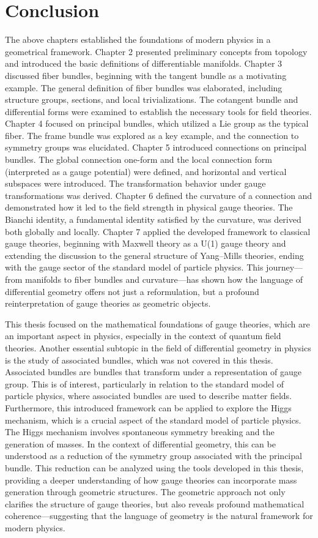 
\chapter{Conclusion}

The above chapters established the foundations of modern physics in a geometrical framework. Chapter 2 presented preliminary concepts from topology and introduced the basic definitions of differentiable manifolds. Chapter 3 discussed fiber bundles, beginning with the tangent bundle as a motivating example. The general definition of fiber bundles was elaborated, including structure groups, sections, and local trivializations. The cotangent bundle and differential forms were examined to establish the necessary tools for field theories. Chapter 4 focused on principal bundles, which utilized a Lie group as the typical fiber. The frame bundle was explored as a key example, and the connection to symmetry groups was elucidated. Chapter 5 introduced connections on principal bundles. The global connection one-form and the local connection form (interpreted as a gauge potential) were defined, and horizontal and vertical subspaces were introduced. The transformation behavior under gauge transformations was derived. Chapter 6 defined the curvature of a connection and demonstrated how it led to the field strength in physical gauge theories. The Bianchi identity, a fundamental identity satisfied by the curvature, was derived both globally and locally. Chapter 7 applied the developed framework to classical gauge theories, beginning with Maxwell theory as a U(1) gauge theory and extending the discussion to the general structure of Yang–Mills theories, ending with the gauge sector of the standard model of particle physics. This journey—from manifolds to fiber bundles and curvature—has shown how the language of differential geometry offers not just a reformulation, but a profound reinterpretation of gauge theories as geometric objects.

This thesis focused on the mathematical foundations of gauge theories, which are an important aspect in physics, especially in the context of quantum field theories. Another essential subtopic in the field of differential geometry in physics is the study of associated bundles, which was not covered in this thesis. Associated bundles are bundles that transform under a representation of gauge group. This is of interest, particularly in relation to the standard model of particle physics, where associated bundles are used to describe matter fields.
Furthermore, this introduced framework can be applied to explore the Higgs mechanism, which is a crucial aspect of the standard model of particle physics. The Higgs mechanism involves spontaneous symmetry breaking and the generation of masses. In the context of differential geometry, this can be understood as a reduction of the symmetry group associated with the principal bundle. This reduction can be analyzed using the tools developed in this thesis, providing a deeper understanding of how gauge theories can incorporate mass generation through geometric structures.
The geometric approach not only clarifies the structure of gauge theories, but also reveals profound mathematical coherence—suggesting that the language of geometry is the natural framework for modern physics.

